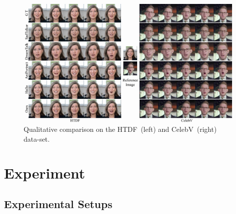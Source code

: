 \begin{figure}[t!]
    \centering
    \includegraphics[width=\linewidth]{figs/HTDF_CelebV_comp.jpg}
    \vspace{-6mm}
    \caption{Qualitative comparison on the HTDF~(left) and CelebV~(right) data-set.}
    \vspace{-2mm}
    \label{fig:hdtf}
\end{figure}







\section{Experiment}
\subsection{Experimental Setups}

